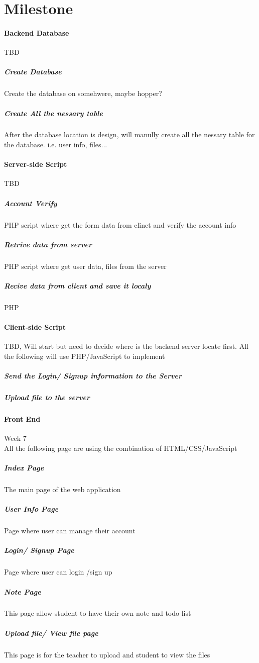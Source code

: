 \documentclass{article}
\begin{document}
\section {Milestone}

\paragraph{Backend Database} TBD 

\subparagraph{Create Database} Create the database on somehwere, maybe hopper?
\subparagraph{Create All the nessary table} After the database location is design, will manully create all the nessary table for the database. i.e. user info, files...

\paragraph{Server-side Script} TBD

\subparagraph{Account Verify} PHP script where get the form data from clinet and verify the account info 
\subparagraph{Retrive data from server} PHP script where get user data, files from the server
\subparagraph{Recive data from client and save it localy} PHP

\paragraph{Client-side Script} TBD, Will start but need to decide where is the backend server locate first. All the following will use PHP/JavaScript to implement 

\subparagraph{Send the Login/ Signup information to the Server}
\subparagraph{Upload file to the server}

\paragraph{Front End} Week 7 \\
All the following page are using the combination of HTML/CSS/JavaScript
\subparagraph{Index Page} The main page of the web application
\subparagraph{User Info Page} Page where user can manage their account
\subparagraph{Login/ Signup Page} Page where user can login /sign up
\subparagraph{Note Page} This page allow student to have their own note and todo list 
\subparagraph{Upload file/ View file page} This page is for the teacher to upload and student to view the files 

\newpage
\end{document}
